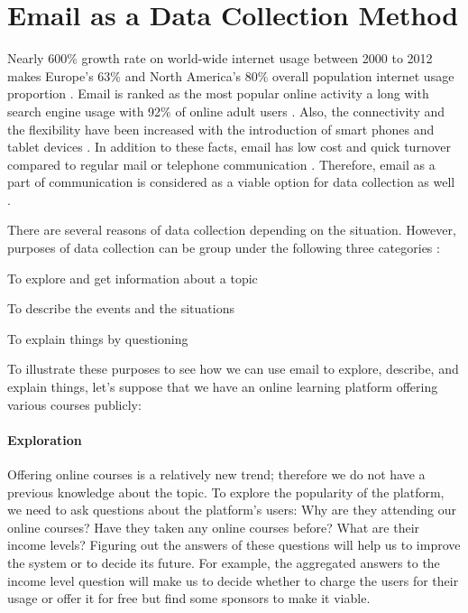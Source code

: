 \section{Email as a Data Collection Method}
\label{sec:1:EmailDataCol}

Nearly 600\% growth rate on world-wide internet usage between 2000 to 2012 makes Europe's 63\% and North America's 80\% overall population internet usage proportion \citep{InternetWorldStats2012}. Email is ranked as the most popular online activity a long with search engine usage with 92\% of online adult users \citep{Purcell2011}. Also, the connectivity and the flexibility have been increased with the introduction of smart phones and tablet devices \citep{Madden2008}. In addition to these facts, email has low cost and quick turnover compared to regular mail or telephone communication \citep{Zikmund2007}. Therefore, email as a part of communication is considered as a viable option for data collection as well \citep{Zikmund2007}.
\vspace{1cm}

There are several reasons of data collection depending on the situation. However, purposes of data collection can be group under the following three categories \citep{Sue2011} \citep[pages 92--94]{Babbie2010}:

\begin{compactenum}
	\item To explore and get information about a topic
	\item To describe the events and the situations
	\item To explain things by questioning
\end{compactenum}

To illustrate these purposes to see how we can use email to explore, describe, and explain things, let's suppose that we have an online learning platform offering various courses publicly:

\paragraph{Exploration}
Offering online courses is a relatively new trend; therefore we do not have a previous knowledge about the topic. To explore the popularity of the platform, we need to ask questions about the platform's users: Why are they attending our online courses? Have they taken any online courses before? What are their income levels? Figuring out the answers of these questions will help us to improve the system or to decide its future. For example, the aggregated answers to the income level question will make us to decide whether to charge the users for their usage or offer it for free but find some sponsors to make it viable.

